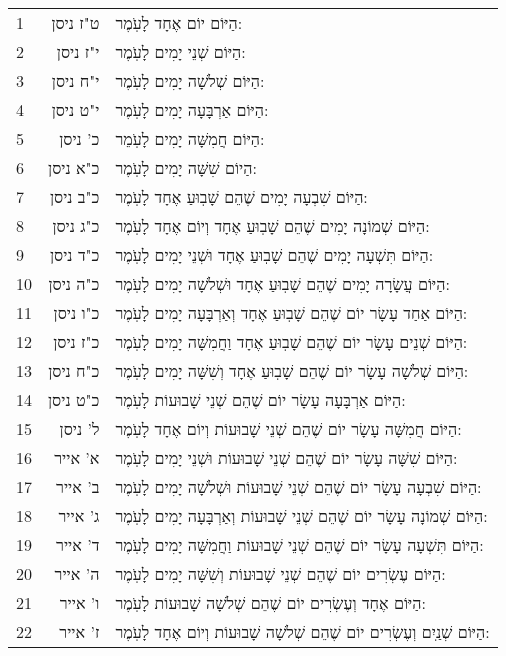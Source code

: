 \documentclass[twoside, openany, parskip=half, 11pt]{book}
\begin{document}
\begin{scriptsize}
\begin{longtable}{ l | r | p{} }
1 & ט"ז ניסן &  הַיּוֹם יוֹם אֶחָד לָעֹֽמֶר: \\
 2 & י"ז ניסן  & הַיּוֹם שְׁנֵי יָמִים לָעֹֽמֶר: \\
 3 & י"ח ניסן  & הַיּוֹם שְׁלֹשָׁה יָמִים לָעֹֽמֶר: \\
 4 & י"ט ניסן  &  הַיּוֹם אַרְבָּעָה יָמִים לָעֹֽמֶר: \\
 5 & כ' ניסן  & הַיּוֹם חֲמִשָּׁה יָמִים לָעֹֽמֵר: \\
 6 & כ"א ניסן  & הַיוֹם שִׁשָּׁה יָמִים לָעֹֽמֶר: \\
 7 & כ"ב ניסן & הַיּוֹם שִׁבְעָה יָמִים שֶׁהֵם שָׁבֽוּעַ אֶחָד לָעֹֽמֶר: \\
 8 & כ"ג ניסן & הַיּוֹם שְׁמוֹנָה יָמִים שֶׁהֵם שָׁבֽוּעַ אֶחָד וְיוֹם אֶחָד לָעֹֽמֶר: \\
 9 & כ"ד ניסן &  הַיּוֹם תִּשְׁעָה יָמִים שֶׁהֵם שָׁבֽוּעַ אֶחָד וּשְׁנֵי יָמִים לָעֹֽמֶר: \\
 10 & כ"ה ניסן & הַיּוֹם עֲשָׂרָה יָמִים שֶׁהֵם שָׁבֽוּעַ אֶחָד וּשְׁלֹשָׁה יָמִים לָעֹֽמֶר: \\
 11 & כ"ו ניסן &  הַיּוֹם אַחַד עָשָׂר יוֹם שֶׁהֵם שָׁבֽוּעַ אֶחָד וְאַרְבָּעָה יָמִים לָעֹֽמֶר: \\
 12 & כ"ז ניסן &  הַיּוֹם שְׁנֵים עָשָׂר יוֹם שֶׁהֵם שָׁבֽוּעַ אֶחָד וַחֲמִשָּׁה יָמִים לָעֹֽמֶר: \\
 13 & כ"ח ניסן &  הַיּוֹם שְׁלֹשָׁה עָשָׂר יוֹם שֶׁהֵם שָׁבֽוּעַ אֶחָד וְשִׁשָּׁה יָמִים לָעֹֽמֶר: \\
 14 &  כ"ט ניסן &  הַיּוֹם אַרְבָּעָה עָשָׂר יוֹם שֶׁהֵם שְׁנֵי שָׁבוּעוֹת לָעֹֽמֶר: \\
 15 & ל' ניסן &  הַיּוֹם חֲמִשָּׁה עָשָׂר יוֹם שֶׁהֵם שְׁנֵי שָׁבוּעוֹת וְיוֹם אֶחָד לָעֹֽמֶר: \\
 16 &  א' אייר & הַיּוֹם שִׁשָּׁה עָשָׂר יוֹם שֶׁהֵם שְׁנֵי שָׁבוּעוֹת וּשְׁנֵי יָמִים לָעֹֽמֶר: \\
17 &  ב' אייר &  הַיּוֹם שִׁבְעָה עָשָׂר יוֹם שֶׁהֵם שְׁנֵי שָׁבוּעוֹת וּשְׁלֹשָׁה יָמִים לָעֹֽמֶר: \\
 18 &   ג' אייר & הַיּוֹם שְׁמוֹנָה עָשָׂר יוֹם שֶׁהֵם שְׁנֵי שָׁבוּעוֹת וְאַרְבָּעָה יָמִים לָעֹֽמֶר: \\
 19 &  ד' אייר &  הַיּוֹם תִּשְׁעָה עָשָׂר יוֹם שֶׁהֵם שְׁנֵי שָׁבוּעוֹת וַחֲמִשָּׁה יָמִים לָעֹֽמֶר: \\
 20 &  ה' אייר &  הַיּוֹם עֶשְׂרִים יוֹם שֶׁהֵם שְׁנֵי שָׁבוּעוֹת וְשִׁשָּׁה יָמִים לָעֹֽמֶר: \\
 21 &  ו' אייר & הַיּוֹם אֶחָד וְעֶשְׂרִים יוֹם שֶׁהֵם שְׁלֹשָׁה שָׁבוּעוֹת לָעֹֽמֶר: \\
 22 &  ז' אייר & הַיּוֹם שְׁנַֽיִם וְעֶשְׂרִים יוֹם שֶׁהֵם שְׁלֹשָׁה שָׁבוּעוֹת וְיוֹם אֶחָד לָעֹֽמֶר: \\

\end{longtable}
\end{scriptsize}
\end{document}
